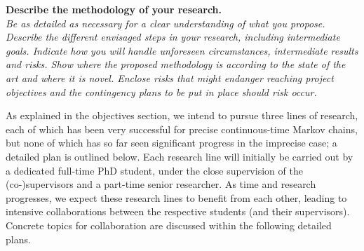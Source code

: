 \documentclass[11pt,dvipsnames,usenames,a4paper]{article}
\begin{document}
\vspace{7pt}

\textbf{Describe the methodology of your research.}\\
\textit{Be as detailed as necessary for a clear understanding of what you propose.
Describe the different envisaged steps in your research, including intermediate goals. Indicate how you will handle unforeseen circumstances, intermediate results and risks.
Show where the proposed methodology is according to the state of the art and where it is novel.
Enclose risks that might endanger reaching project objectives and the contingency plans to be put in place should risk occur.}

As explained in the objectives section, we intend to pursue three lines of research, each of which has been very successful for precise continuous-time Markov chains, but none of which has so far seen significant progress in the imprecise case; a detailed plan is outlined below. 
Each research line will initially be carried out by a dedicated full-time PhD student, under the close supervision of the (co-)supervisors and a part-time senior researcher. 
As time and research progresses, we expect these research lines to benefit from each other, leading to intensive collaborations between the respective students (and their supervisors). Concrete topics for collaboration are discussed within the following detailed plans.
\end{document}
